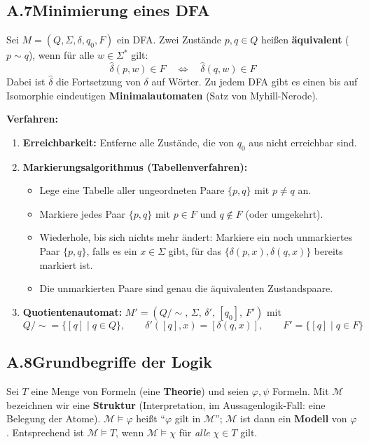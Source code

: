 \subsection*{A.7\quad Minimierung eines DFA}

Sei $M = (Q,\Sigma,\delta,q_0,F)$ ein DFA. Zwei Zustände $p,q \in Q$ heißen \textbf{äquivalent} ($p \sim q$), wenn für alle $w \in \Sigma^*$ gilt:
\[
  \hat{\delta}(p,w) \in F \quad\Longleftrightarrow\quad \hat{\delta}(q,w) \in F
\]
Dabei ist $\hat{\delta}$ die Fortsetzung von $\delta$ auf Wörter. Zu jedem DFA gibt es einen bis auf Isomorphie eindeutigen \textbf{Minimalautomaten} (Satz von Myhill-Nerode).

\medskip
\noindent\textbf{Verfahren:}
\begin{enumerate}[1.]
  \item \textbf{Erreichbarkeit:} Entferne alle Zustände, die von $q_0$ aus nicht erreichbar sind.
  \item \textbf{Markierungsalgorithmus (Tabellenverfahren):}
  \begin{itemize}
    \item Lege eine Tabelle aller ungeordneten Paare $\{p,q\}$ mit $p \neq q$ an.
    \item Markiere jedes Paar $\{p,q\}$ mit $p \in F$ und $q \notin F$ (oder umgekehrt).
    \item Wiederhole, bis sich nichts mehr ändert: Markiere ein noch unmarkiertes Paar $\{p,q\}$, falls es ein $x \in \Sigma$ gibt, für das $\{\delta(p,x), \delta(q,x)\}$ bereits markiert ist.
    \item Die unmarkierten Paare sind genau die äquivalenten Zustandspaare.
  \end{itemize}
  \item \textbf{Quotientenautomat:} $M' = (Q/{\sim},\, \Sigma,\, \delta',\, [q_0],\, F')$ mit
  \[
    Q/{\sim} = \{[q] \mid q \in Q\},\qquad
    \delta'([q],x) = [\delta(q,x)],\qquad
    F' = \{[q] \mid q \in F\}
  \]
\end{enumerate}


\newpage
\subsection*{A.8\quad Grundbegriffe der Logik}

Sei $T$ eine Menge von Formeln (eine \textbf{Theorie}) und seien $\varphi,\psi$ Formeln. Mit $\mathcal{M}$ bezeichnen wir eine \textbf{Struktur} (Interpretation, im Aussagenlogik-Fall: eine Belegung der Atome). $\mathcal{M}\models\varphi$ heißt \enquote{$\varphi$ gilt in $\mathcal{M}$}; $\mathcal{M}$ ist dann ein \textbf{Modell} von $\varphi$. Entsprechend ist $\mathcal{M}\models T$, wenn $\mathcal{M}\models\chi$ für \emph{alle} $\chi\in T$ gilt.

